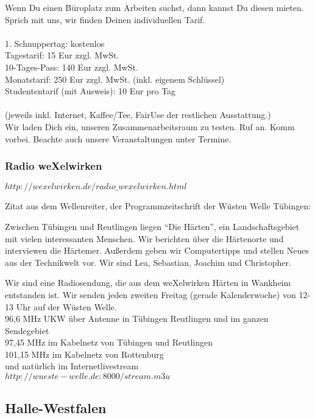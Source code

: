 \begin{appendix}
Wenn Du einen Büroplatz zum Arbeiten suchst, dann kannst Du diesen mieten.
Sprich mit uns, wir finden Deinen individuellen Tarif.\\
\\
    1. Schnuppertag: kostenlos\\
    Tagestarif: 15 Eur zzgl. MwSt.\\ 
    10-Tages-Pass: 140 Eur zzgl. MwSt.\\
    Monatstarif: 250 Eur zzgl. MwSt. (inkl. eigenem Schlüssel)\\
    Studententarif (mit Ausweis): 10 Eur pro Tag\\
\\
(jeweils inkl. Internet, Kaffee/Tee, FairUse der restlichen Ausstattung.)\\

Wir laden Dich ein, unseren Zusammenarbeitsraum zu testen.
%
Ruf an. Komm vorbei.
%
Beachte auch unsere Veranstaltungen unter Termine.
      \subsubsection{Radio weXelwirken}
      
$http://wexelwirken.de/radio\_wexelwirken.html$
      


Zitat aus dem Wellenreiter, der Programmzeitschrift der Wüsten Welle Tübingen:



Zwischen Tübingen und Reutlingen liegen "`Die Härten"', ein Landschaftsgebiet mit vielen interessanten Menschen.
%
Wir berichten über die Härtenorte und interviewen die Härtemer.
%
Außerdem geben wir Computertipps und stellen Neues aus der Technikwelt vor.
%
Wir sind Lea, Sebastian, Joachim und Christopher.



Wir sind eine Radiosendung, die aus dem weXelwirken Härten in Wankheim entstanden ist.
%
Wir senden jeden zweiten Freitag (gerade Kalenderwoche) von 12-13 Uhr auf der Wüsten Welle.\\
96,6 MHz UKW über Antenne in Tübingen Reutlingen und im ganzen Sendegebiet\\
97,45 MHz im Kabelnetz von Tübingen und Reutlingen\\
101,15 MHz im Kabelnetz von Rottenburg\\
und natürlich im Internetlivestream\\
$http://wueste-welle.de:8000/stream.m3u$
  \subsection{Halle-Westfalen}

\end{appendix}
